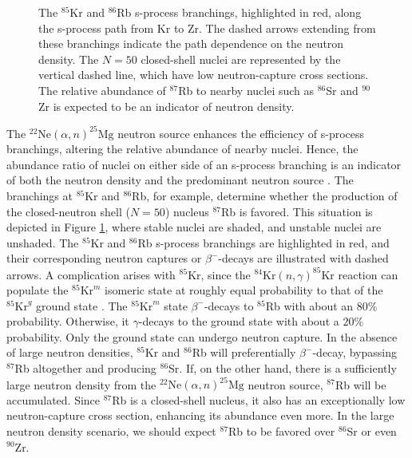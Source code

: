 \begin{figure}[!pt]
\caption{\label{fig:Rb86Branch}The $^{85}$Kr and $^{86}$Rb s-process branchings, highlighted in red, along the s-process path from Kr to Zr. The dashed arrows extending from these branchings indicate the path dependence on the neutron density. The $N=50$ closed-shell nuclei are represented by the vertical dashed line, which have low neutron-capture cross sections. The relative abundance of $^{87}$Rb to nearby nuclei such as $^{86}$Sr and $^{90}$Zr is expected to be an indicator of neutron density.}
\end{figure}

The $^{22}\mathrm{Ne}(\alpha,n)^{25}\mathrm{Mg}$ neutron source enhances the efficiency of s-process branchings, altering the relative abundance of nearby nuclei. Hence, the abundance ratio of nuclei on either side of an s-process branching is an indicator of both the neutron density and the predominant neutron source \cite{Garcia2006}. The branchings at $^{85}$Kr and $^{86}$Rb, for example, determine whether the production of the closed-neutron shell ($N=50$) nucleus $^{87}$Rb is favored. This situation is depicted in Figure \ref{fig:Rb86Branch}, where stable nuclei are shaded, and unstable nuclei are unshaded. The $^{85}$Kr and $^{86}$Rb s-process branchings are highlighted in red, and their corresponding neutron captures or $\beta^{-}$-decays are illustrated with dashed arrows. A complication arises with $^{85}$Kr, since the $^{84}\mathrm{Kr}(n,\gamma)^{85}\mathrm{Kr}$ reaction can populate the $^{85}\mathrm{Kr}^{m}$ isomeric state at roughly equal probability to that of the $^{85}\mathrm{Kr}^{g}$ ground state \cite{Raut2013}. The $^{85}\mathrm{Kr}^{m}$ state $\beta^{-}$-decays to $^{85}$Rb with about an $80\%$ probability. Otherwise, it $\gamma$-decays to the ground state with about a $20\%$ probability. Only the ground state can undergo neutron capture. In the absence of large neutron densities, $^{85}$Kr and $^{86}$Rb will preferentially $\beta^{-}$-decay, bypassing $^{87}$Rb altogether and producing $^{86}$Sr. If, on the other hand, there is a sufficiently large neutron density from the $^{22}\mathrm{Ne}(\alpha,n)^{25}\mathrm{Mg}$ neutron source, $^{87}$Rb will be accumulated. Since $^{87}$Rb is a closed-shell nucleus, it also has an exceptionally low neutron-capture cross section, enhancing its abundance even more. In the large neutron density scenario, we should expect $^{87}$Rb to be favored over $^{86}$Sr or even $^{90}$Zr.

